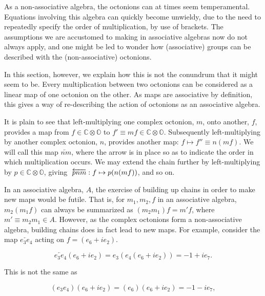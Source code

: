 \documentclass[letterpaper,12pt,titlepage,oneside,final]{book}
\begin{document}
As a non-associative algebra, the octonions can at times seem temperamental.  Equations involving this algebra can quickly become unwieldy, due to the need to repeatedly specify the order of multiplication, by use of brackets.  The assumptions we are accustomed to making in associative algebras now do not always apply, and one might be led to wonder how (associative) groups can be described with the (non-associative) octonions.  

In this section, however,  we explain how this is not the conundrum that it might seem to be.  Every multiplication between two octonions can be considered as a linear map of one octonion on the other.  As maps are associative by definition, this gives a way of re-describing the action of octonions as an associative algebra.

\vspace{.5cm}

It is plain to see that left-multiplying one complex octonion, $m$, onto another, $f$, provides a map from $f\in\mathbb{C}\otimes\mathbb{O}$ to $f'\equiv mf \in\mathbb{C}\otimes\mathbb{O}$.  Subsequently left-multiplying by another complex octonion, $n$, provides another map: $f\mapsto  f'' \equiv n(mf)$.  We will call this map $\overleftarrow{nm}$, where the arrow is in place so as to indicate the order in which multiplication occurs.  We may extend the chain further by left-multiplying by $p\in\mathbb{C}\otimes\mathbb{O}$, giving  $\hspace{1mm}\overleftarrow{pnm}:f\mapsto p(n(mf))$, and so on.

In an associative algebra, $A$, the exercise of building up chains in order to make new maps would be futile.  That is, for $m_1, m_2, f$ in an associative algebra, $m_2(m_1f)$ can always be summarized as $(m_2m_1)f=m'f$, where $m'\equiv m_2m_1 \in A$.  However, as the complex octonions form a non-associative algebra, building chains does in fact lead to new maps.  For example, consider the map $\overleftarrow{e_3e_4}$ acting on $f=\left(e_6+ie_2 \right)$. 

\begin{equation}\overleftarrow{e_{3}e_{4}}\left(e_6+ie_2 \right) =  e_3 \left( e_4 \left( e_6+ie_2  \right) \right) =  -1 +ie_7.
\end{equation}

\noindent This is not the same as 

\begin{equation}
\left( e_3  e_4 \right) \left( e_6+ie_2  \right)= \left( e_6 \right) \left(e_6+ie_2  \right)=  -1 -ie_7 , 
\end{equation}
\end{document}
